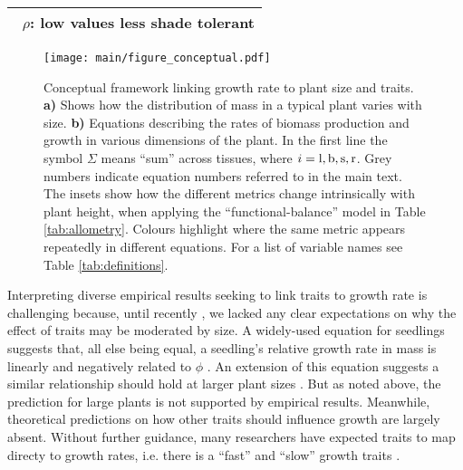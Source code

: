 \documentclass[9pt,twocolumn,twoside,lineno]{pnas-new}
\begin{document}
\begin{table}[!ht]
\begin{tabular}{p{8cm}}
 $\,$ $\rho$: low values less shade tolerant \citep{Osunkoya-1996}\\
  \bottomrule
\end{tabular}
\label{tab:phenomena}
\end{table}


\begin{figure}[!hb]
\centering
\texttt{[image: main/figure\_conceptual.pdf]}
\caption{Conceptual framework linking growth rate to plant size and traits.
\textbf{a)} Shows how the distribution of mass in a typical plant varies with size.
\textbf{b)} Equations describing the rates of biomass production and growth in various dimensions of the plant. In the first line the symbol $\Sigma$ means ``sum'' across tissues, where $i = {\rm l,b,s,r}$. Grey numbers indicate equation numbers referred to in the main text. The insets show how the different metrics change intrinsically with plant height, when applying the ``functional-balance'' model in Table \ref{tab:allometry}. Colours highlight where the same metric appears repeatedly in different equations. For a list of variable names see Table \ref{tab:definitions}.}
\label{fig:conceptual}
\end{figure}

Interpreting diverse empirical results seeking to link traits to growth rate is challenging because, until recently \citep{Gibert-2016}, we lacked any clear expectations on why the effect of traits may be moderated by size. A widely-used equation for seedlings suggests that, all else being equal, a seedling's relative growth rate in mass is linearly and negatively related to $\phi$ \citep{Lambers-1992, Cornelissen-1996, Wright-2000}. An extension of this equation suggests a similar relationship should hold at larger plant sizes \citep{Enquist-2007}. But as noted above, the prediction for large plants is not supported by empirical results. Meanwhile, theoretical predictions on how other traits should influence growth are largely absent. Without further guidance, many researchers have expected traits to map directy to growth rates, i.e. there is a ``fast'' and ``slow'' growth traits \citep[e.g.][]{Grime-1977, Poorter-2008, Chave-2009, Paine-2015}.
\end{document}
